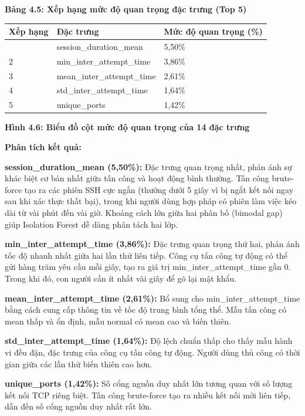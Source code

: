 \documentclass[
  a4paper]{report}
\newcounter{none} %
\begin{document}
\textbf{Bảng 4.5: Xếp hạng mức độ quan trọng đặc trưng (Top 5)}

{\def\LTcaptype{none} %
\begin{longtable}[]{@{}lll@{}}
\toprule\noalign{}
Xếp hạng & Đặc trưng & Mức độ quan trọng (\%) \\
\midrule\noalign{}
\endhead
\bottomrule\noalign{}
\endlastfoot
1 & session\_duration\_mean & 5,50\% \\
2 & min\_inter\_attempt\_time & 3,86\% \\
3 & mean\_inter\_attempt\_time & 2,61\% \\
4 & std\_inter\_attempt\_time & 1,64\% \\
5 & unique\_ports & 1,42\% \\
\end{longtable}
}

\textbf{Hình 4.6: Biểu đồ cột mức độ quan trọng của 14 đặc trưng}

\textbf{Phân tích kết quả:}

\textbf{session\_duration\_mean (5,50\%):} Đặc trưng quan trọng nhất,
phản ánh sự khác biệt cơ bản nhất giữa tấn công và hoạt động bình
thường. Tấn công brute-force tạo ra các phiên SSH cực ngắn (thường dưới
5 giây vì bị ngắt kết nối ngay sau khi xác thực thất bại), trong khi
người dùng hợp pháp có phiên làm việc kéo dài từ vài phút đến vài giờ.
Khoảng cách lớn giữa hai phân bố (bimodal gap) giúp Isolation Forest dễ
dàng phân tách hai lớp.

\textbf{min\_inter\_attempt\_time (3,86\%):} Đặc trưng quan trọng thứ
hai, phản ánh tốc độ nhanh nhất giữa hai lần thử liên tiếp. Công cụ tấn
công tự động có thể gửi hàng trăm yêu cầu mỗi giây, tạo ra giá trị
min\_inter\_attempt\_time gần 0. Trong khi đó, con người cần ít nhất vài
giây để gõ lại mật khẩu.

\textbf{mean\_inter\_attempt\_time (2,61\%):} Bổ sung cho
min\_inter\_attempt\_time bằng cách cung cấp thông tin về tốc độ trung
bình tổng thể. Mẫu tấn công có mean thấp và ổn định, mẫu normal có mean
cao và biến thiên.

\textbf{std\_inter\_attempt\_time (1,64\%):} Độ lệch chuẩn thấp cho thấy
mẫu hành vi đều đặn, đặc trưng của công cụ tấn công tự động. Người dùng
thủ công có thời gian giữa các lần thử biến thiên cao hơn.

\textbf{unique\_ports (1,42\%):} Số cổng nguồn duy nhất lớn tương quan
với số lượng kết nối TCP riêng biệt. Tấn công brute-force tạo ra nhiều
kết nối mới liên tiếp, dẫn đến số cổng nguồn duy nhất rất lớn.
\end{document}
